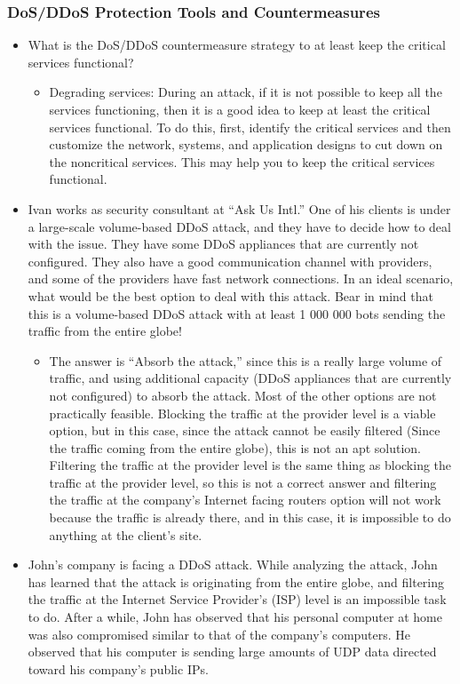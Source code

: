 \subsubsection{DoS/DDoS Protection Tools and Countermeasures}
\begin{itemize}
    \item What is the DoS/DDoS countermeasure strategy to at least keep the critical services functional?
    \begin{itemize}
        \item Degrading services: During an attack, if it is not possible to keep all the services functioning, then it is a good idea to keep at least the critical services functional. To do this, first, identify the critical services and then customize the network, systems, and application designs to cut down on the noncritical services. This may help you to keep the critical services functional.
    \end{itemize}
    \item Ivan works as security consultant at “Ask Us Intl.” One of his clients is under a large-scale volume-based DDoS attack, and they have to decide how to deal with the issue. They have some DDoS appliances that are currently not configured. They also have a good communication channel with providers, and some of the providers have fast network connections. In an ideal scenario, what would be the best option to deal with this attack. Bear in mind that this is a volume-based DDoS attack with at least 1 000 000 bots sending the traffic from the entire globe!
    \begin{itemize}
        \item The answer is “Absorb the attack,” since this is a really large volume of traffic, and using additional capacity (DDoS appliances that are currently not configured) to absorb the attack. Most of the other options are not practically feasible. Blocking the traffic at the provider level is a viable option, but in this case, since the attack cannot be easily filtered (Since the traffic coming from the entire globe), this is not an apt solution. Filtering the traffic at the provider level is the same thing as blocking the traffic at the provider level, so this is not a correct answer and filtering the traffic at the company's Internet facing routers option will not work because the traffic is already there, and in this case, it is impossible to do anything at the client's site.
    \end{itemize}
    \item John's company is facing a DDoS attack. While analyzing the attack, John has learned that the attack is originating from the entire globe, and filtering the traffic at the Internet Service Provider's (ISP) level is an impossible task to do. After a while, John has observed that his personal computer at home was also compromised similar to that of the company's computers. He observed that his computer is sending large amounts of UDP data directed toward his company's public IPs.


\end{itemize}
